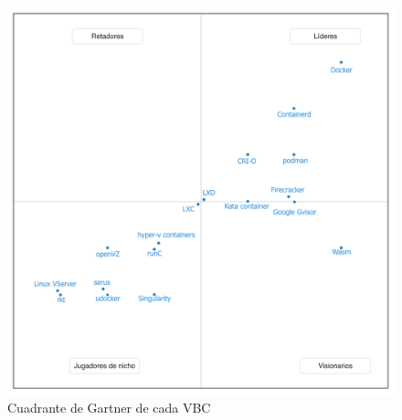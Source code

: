 \begin{figure}[H]
    \centering
    \includegraphics[width=\textwidth] {tablas-images/cp3/cuadrante-gartner.png}
    \caption{Cuadrante de Gartner de cada VBC}\label{fig:tabla-cuadrante-gartner}
\end{figure}
